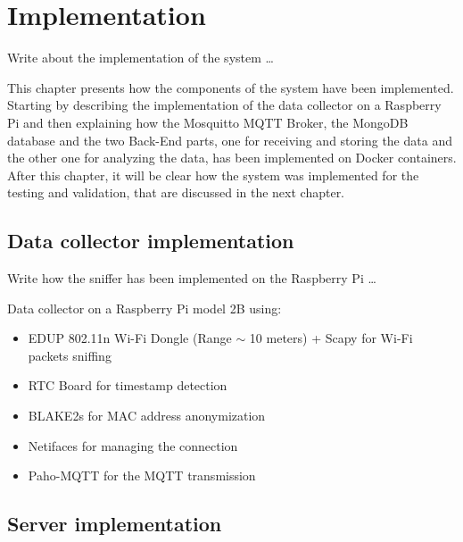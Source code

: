 \chapter{Implementation}
\label{cha:implementation}
\vspace{0.4 cm} 

Write about the implementation of the system \dots

This chapter presents how the components of the system have been implemented.
Starting by describing the implementation of the data collector on a Raspberry Pi and then explaining how the Mosquitto MQTT Broker, the MongoDB database and the two Back-End parts, one for receiving and storing the data and the other one for analyzing the data, has been implemented on Docker containers. After this chapter, it will be clear how the system was implemented for the testing and validation, that are discussed in the next chapter.


\section{Data collector implementation}
\label{sec:collector}
\vspace{0.2 cm} 

Write how the sniffer has been implemented on the Raspberry Pi \dots

Data collector on a Raspberry Pi model 2B using:
\begin{itemize}
  \item EDUP 802.11n Wi-Fi Dongle (Range $\sim$ 10 meters) + Scapy for Wi-Fi packets sniffing
  \item RTC Board for timestamp detection
  \item BLAKE2s for MAC address anonymization
  \item Netifaces for managing the connection
  \item Paho-MQTT for the MQTT transmission
\end{itemize}





\section{Server implementation}
\label{sec:server}
\vspace{0.2 cm} 

